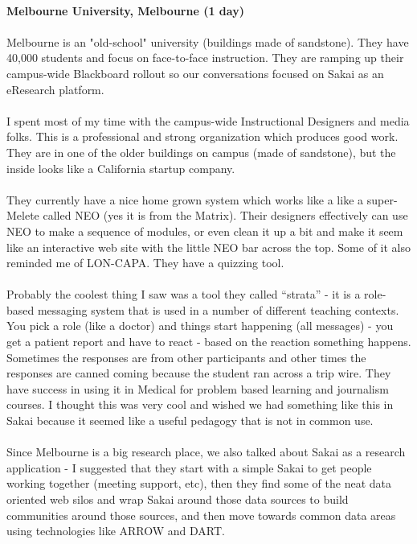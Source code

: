\documentclass[12pt]{book}
\begin{document}
\\
{\bf Melbourne University, Melbourne (1 day)}\\
\\
Melbourne is an "old-school" university (buildings made of sandstone).   They have 40,000 students and focus on face-to-face instruction.   They are ramping up their campus-wide   Blackboard rollout so our conversations focused on Sakai as an eResearch platform.  \\
\\
I spent most of my time with the campus-wide Instructional Designers and media folks.   This is a professional and strong organization which produces good work.   They are in one of the older buildings on campus (made of sandstone), but the inside looks like a California startup company.\\
\\
They currently have a nice home grown system which works like a like a super-Melete called NEO (yes it is from the Matrix).   Their designers effectively can use NEO to make a sequence of modules, or even clean it up a bit and make it seem like an interactive web site with the little NEO bar across the top.   Some of it also reminded me of LON-CAPA.   They have a quizzing tool.   \\
\\
Probably the coolest thing I saw was a tool they called ``strata'' - it is a role-based messaging system that is used in a number of different teaching contexts.   You pick a role (like a doctor) and things start happening (all messages) - you get a patient report and have to react - based on the reaction something happens.   Sometimes the responses are from other participants and other times the responses are canned coming because the student ran across a trip wire.   They have success in using it in Medical for problem based learning and journalism courses.   I thought this was very cool and wished we had something like this in Sakai because it seemed like a useful pedagogy that is not in common use.\\
\\
Since Melbourne is a big research place, we also talked about Sakai as a research application - I suggested that they start with a simple Sakai to get people working together (meeting support, etc), then they find some of the neat data oriented web silos and wrap Sakai around those data sources to build communities around those sources, and then move towards common data areas using technologies like ARROW and DART.\\
\end{document}
